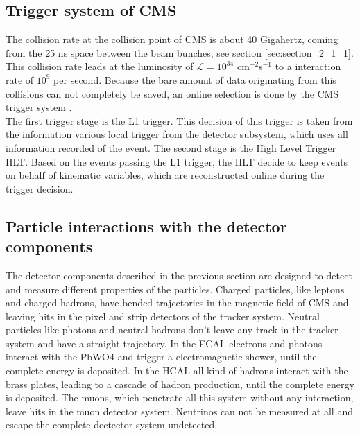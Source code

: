 \subsection{Trigger system of \gls{CMS}}
\label{sec:section_2_2_3}

The collision rate at the collision point of \gls{CMS} is about 40 Gigahertz, coming from the 25 ns space between the beam bunches, see section \ref{sec:section_2_1_1}. This collision rate leads at the luminosity of $\mathcal{L} = 10^{34}$ cm$^{-2}$s$^{-1}$ to a interaction rate of $10^9$ per second. Because the bare amount of data originating from this collisions can not completely be saved, an online selection is done by the \gls{CMS} trigger system \cite{CMS2, TRIGGER}. \\

The first trigger stage is the L1 trigger. This decision of this trigger is taken from the information various local trigger from the detector subsystem, which uses all information recorded of the event. The second stage is the High Level Trigger \gls{HLT}. Based on the events passing the L1 trigger, the \gls{HLT} decide to keep events on behalf of kinematic variables, which are reconstructed online during the trigger decision. 

\subsection{Particle interactions with the detector components}
\label{sec:section_2_2_4}

The detector components described in the previous section are designed to detect and measure different properties of the particles. Charged particles, like leptons and charged hadrons, have bended trajectories in the magnetic field of \gls{CMS} and leaving hits in the pixel and strip detectors of the tracker system. Neutral particles like photons and neutral hadrons don't leave any track in the tracker system and have a straight trajectory. In the \gls{ECAL} electrons and photons interact with the \gls{PbWO4} and trigger a electromagnetic shower, until the complete energy is deposited. In the \gls{HCAL} all kind of hadrons interact with the brass plates, leading to a cascade of hadron production, until the complete energy is deposited. The muons, which penetrate all this system without any interaction, leave hits in the muon detector system. Neutrinos can not be measured at all and escape the complete dectector system undetected. \\

